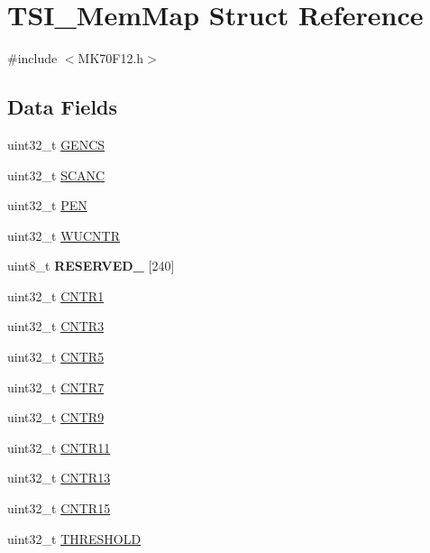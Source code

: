 \hypertarget{struct_t_s_i___mem_map}{}\section{T\+S\+I\+\_\+\+Mem\+Map Struct Reference}
\label{struct_t_s_i___mem_map}


{\ttfamily \#include $<$M\+K70\+F12.\+h$>$}

\subsection*{Data Fields}
\begin{DoxyCompactItemize}
\item 
uint32\+\_\+t \hyperlink{struct_t_s_i___mem_map_a14380d508e161af3b794962e7c3f8abb}{G\+E\+N\+C\+S}
\item 
uint32\+\_\+t \hyperlink{struct_t_s_i___mem_map_abbf29c929817b57dbec256343e066a85}{S\+C\+A\+N\+C}
\item 
uint32\+\_\+t \hyperlink{struct_t_s_i___mem_map_a37c8a06461ca09948d6a65a1289bccd9}{P\+E\+N}
\item 
uint32\+\_\+t \hyperlink{struct_t_s_i___mem_map_ae36ce42bd55889c91be08af94a07203e}{W\+U\+C\+N\+T\+R}
\item 
\hypertarget{struct_t_s_i___mem_map_ac6145aadc4fc2ef5290b0fdd2dc6822c}{}uint8\+\_\+t {\bfseries R\+E\+S\+E\+R\+V\+E\+D\+\_} \mbox{[}240\mbox{]}\label{struct_t_s_i___mem_map_ac6145aadc4fc2ef5290b0fdd2dc6822c}

\item 
uint32\+\_\+t \hyperlink{struct_t_s_i___mem_map_a04fc03ca20b588fb20be9eee512fbfeb}{C\+N\+T\+R1}
\item 
uint32\+\_\+t \hyperlink{struct_t_s_i___mem_map_a6784d9dce99cc4d0e04e4e527513c525}{C\+N\+T\+R3}
\item 
uint32\+\_\+t \hyperlink{struct_t_s_i___mem_map_a16e7aed31d05ac2b570308c208471959}{C\+N\+T\+R5}
\item 
uint32\+\_\+t \hyperlink{struct_t_s_i___mem_map_a3c2f3ddd1d3725bef9e71fdf30a5ee8a}{C\+N\+T\+R7}
\item 
uint32\+\_\+t \hyperlink{struct_t_s_i___mem_map_a1792ec66ee609674ea272871f5abcf1c}{C\+N\+T\+R9}
\item 
uint32\+\_\+t \hyperlink{struct_t_s_i___mem_map_a73d4134257f7351180c72870359b2bbf}{C\+N\+T\+R11}
\item 
uint32\+\_\+t \hyperlink{struct_t_s_i___mem_map_aa09add648d77175d86d87c2d3533af74}{C\+N\+T\+R13}
\item 
uint32\+\_\+t \hyperlink{struct_t_s_i___mem_map_aada5f006d1b63bfb573ec56cdf21e4bc}{C\+N\+T\+R15}
\item 
uint32\+\_\+t \hyperlink{struct_t_s_i___mem_map_a716863c50b790ef08399633c624ad313}{T\+H\+R\+E\+S\+H\+O\+L\+D}
\end{DoxyCompactItemize}


